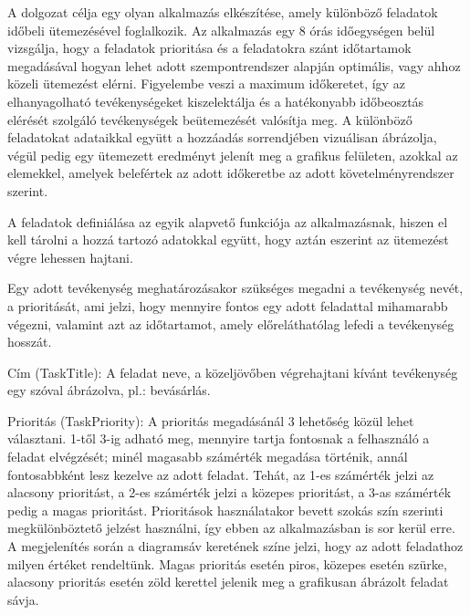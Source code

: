 

A dolgozat célja egy olyan alkalmazás elkészítése, amely különböző feladatok időbeli ütemezésével foglalkozik. Az alkalmazás egy 8 órás időegységen belül vizsgálja, hogy a feladatok prioritása és a feladatokra szánt időtartamok megadásával hogyan lehet adott szempontrendszer alapján optimális, vagy ahhoz közeli ütemezést elérni. Figyelembe veszi a maximum időkeretet, így az elhanyagolható tevékenységeket kiszelektálja és a hatékonyabb időbeosztás elérését szolgáló tevékenységek beütemezését valósítja meg. A különböző feladatokat adataikkal együtt a hozzáadás sorrendjében vizuálisan ábrázolja, végül pedig egy ütemezett eredményt jelenít meg a grafikus felületen, azokkal az elemekkel, amelyek belefértek az adott időkeretbe az adott követelményrendszer szerint.


A feladatok definiálása az egyik alapvető funkciója az alkalmazásnak, hiszen el kell tárolni a hozzá tartozó adatokkal együtt, hogy aztán eszerint az ütemezést végre lehessen hajtani. 


Egy adott tevékenység meghatározásakor szükséges megadni a tevékenység nevét, a prioritását, ami jelzi, hogy mennyire fontos egy adott feladattal mihamarabb végezni, valamint azt az időtartamot, amely előreláthatólag lefedi a tevékenység hosszát.

Cím (TaskTitle): A feladat neve, a közeljövőben végrehajtani kívánt tevékenység egy szóval ábrázolva, pl.: bevásárlás.

Prioritás (TaskPriority): A prioritás megadásánál 3 lehetőség közül lehet választani. 1-től 3-ig adható meg, mennyire tartja fontosnak a felhasználó a feladat elvégzését; minél magasabb számérték megadása történik, annál fontosabbként lesz kezelve az adott feladat. Tehát, az 1-es számérték jelzi az alacsony prioritást, a 2-es számérték jelzi a közepes prioritást, a 3-as számérték pedig a magas prioritást. Prioritások használatakor bevett szokás szín szerinti megkülönböztető jelzést használni, így ebben az alkalmazásban is sor kerül erre. A megjelenítés során a diagramsáv keretének színe jelzi, hogy az adott feladathoz milyen értéket rendeltünk. Magas prioritás esetén piros, közepes esetén szürke, alacsony prioritás esetén zöld kerettel jelenik meg a grafikusan ábrázolt feladat sávja.

